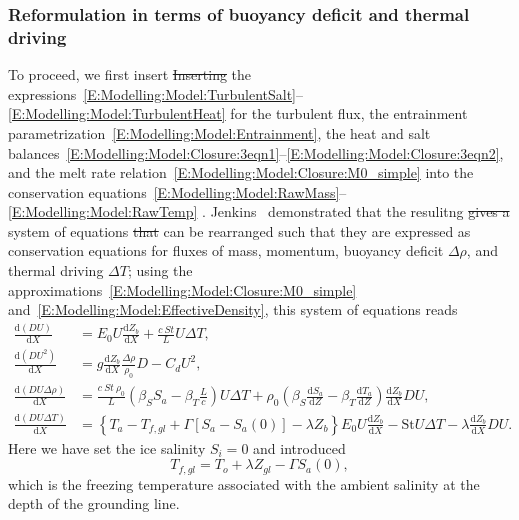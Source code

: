 \documentclass[openacc]{rsproca_new}%
\newcommand{\dd}[2]{\frac{\mathrm{d} #1}{\mathrm{d} #2}}
\newcommand{\red}[1]{{\color{red} #1}}
\newcommand{\blue}[1]{{\color{blue} #1}}
\newcommand{\rout}[1]{\red{\st{#1}}}\newcommand{\ab}[1]{\textcolor{Green}{#1}}\newcommand{\about}[1]{\textcolor{Cyan}{\sout{#1}}}
\begin{document}
\subsubsection{Reformulation in terms of buoyancy deficit and thermal driving}
\blue{To proceed, we first insert}\rout{Inserting} the expressions~\eqref{E:Modelling:Model:TurbulentSalt}--\eqref{E:Modelling:Model:TurbulentHeat} for the turbulent flux, the entrainment parametrization~\eqref{E:Modelling:Model:Entrainment}, the heat and salt balances~\eqref{E:Modelling:Model:Closure:3eqn1}--\eqref{E:Modelling:Model:Closure:3eqn2}, and the melt rate relation~\eqref{E:Modelling:Model:Closure:M0_simple} into the conservation equations~\eqref{E:Modelling:Model:RawMass}--\eqref{E:Modelling:Model:RawTemp}\blue{. Jenkins~\cite{Jenkins2011JPhysOcean} demonstrated that the resulitng}\rout{gives a} system of equations \rout{that }can be rearranged such that they are expressed as conservation equations for fluxes of mass, momentum, buoyancy deficit \blue{$\Delta \rho$}, and thermal driving \blue{$\Delta T$}; using the approximations~\eqref{E:Modelling:Model:Closure:M0_simple} and~\eqref{E:Modelling:Model:EffectiveDensity}, this system of equations reads
\begin{align}
\dd{(DU)}{X} &= E_0 U \dd{Z_b}{X}+ \frac{c~\textit{St}}{L}U\Delta T,\label{E:Modelling:Model:Mass}\\
\dd{(DU^2)}{X} &= g \dd{Z_b}{X} \frac{\Delta \rho }{\rho_0} D - C_d U^2, \label{E:Modelling:Model:Mom}\\
\dd{(DU\Delta \rho)}{X} &= \frac{c~\textit{St}~\rho_0}{L}\left(\beta_S S_a - \beta_T \frac{L}{c}\right) U\Delta T + \rho_0\left(\beta_S \dd{S_a}{Z}-\beta_T \dd{T_a}{Z}\right) \dd{Z_b}{X} DU, \label{E:Modelling:Model:Buoyancy}\\
\dd{(DU\Delta T)}{X} &= \left\{T_a - T_{f,gl} + \Gamma \left[S_a - S_a(0)\right] - \lambda Z_b\right\}E_0 U \dd{Z_b}{X} - \mathrm{St}U \Delta T - \lambda \dd{Z_b}{X} DU.
\label{E:Modelling:Model:Thermal}
\end{align}
Here we have set the ice salinity $S_i = 0$ and introduced
\begin{equation}
T_{f,gl} = T_o + \lambda Z_{gl} - \Gamma S_a(0),
\end{equation}
which is the freezing temperature associated with the ambient salinity at the depth of the grounding line.
\end{document}
